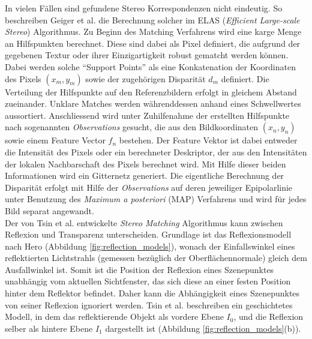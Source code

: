 \noindent
In vielen Fällen sind gefundene Stereo Korrespondenzen nicht eindeutig. So beschreiben Geiger et al. \cite{geiger2011efficient} die Berechnung solcher im ELAS (\emph{Efficient Large-scale Stereo}) Algorithmus. Zu Beginn des Matching Verfahrens wird eine karge Menge an Hilfspunkten berechnet. Diese sind dabei als Pixel definiert, die aufgrund der gegebenen Textur oder ihrer Einzigartigkeit robust gematcht werden können. Dabei werden solche \enquote{Support Points} als eine Kon­ka­te­na­ti­on der Koordinaten des Pixels $(x_m,y_m)$ sowie der zugehörigen Disparität $d_m$ definiert. Die Verteilung der Hilfspunkte auf den Referenzbildern erfolgt in gleichem Abstand zueinander. Unklare Matches werden währenddessen anhand eines Schwellwertes aussortiert. Anschliessend wird unter Zuhilfenahme der erstellten Hilfspunkte nach sogenannten \emph{Observations} gesucht, die aus den Bildkoordinaten $(x_n,y_n)$ sowie einem Feature Vector $f_n$ bestehen. Der Feature Vektor ist dabei entweder die Intensität des Pixels oder ein berechneter Deskriptor, der aus den Intensitäten der lokalen Nachbarschaft des Pixels berechnet wird. Mit Hilfe dieser beiden Informationen wird ein Gitternetz generiert. Die eigentliche Berechnung der Disparität erfolgt mit Hilfe der \emph{Observations} auf deren jeweiliger Epipolarlinie unter Benutzung des \emph{Maximum a posteriori} (MAP) Verfahrens und wird für jedes Bild separat angewandt.\\

\noindent
Der von Tsin et al. \cite{tsin2003stereo} entwickelte \emph{Stereo Matching} Algorithmus kann zwischen Reflexion und Transparenz unterscheiden.
Grundlage ist das Reflexionsmodell nach Hero (Abbildung \ref{fig:reflection_models}), wonach der Einfallswinkel eines reflektierten Lichtstrahls (gemessen bezüglich der Oberflächennormale) gleich dem Ausfallwinkel ist. Somit ist die Position der Reflexion eines Szenepunktes unabhängig vom aktuellen Sichtfenster, das sich diese an einer festen Position hinter dem Reflektor befindet. Daher kann die Abhängigkeit eines Szenepunktes von seiner Reflexion ignoriert werden. Tsin et al. beschreiben ein geschichtetes Modell, in dem das reflektierende Objekt als vordere Ebene $I_0$, und die Reflexion selber als hintere Ebene $I_1$ dargestellt ist (Abbildung \ref{fig:reflection_models}(b)).\\

